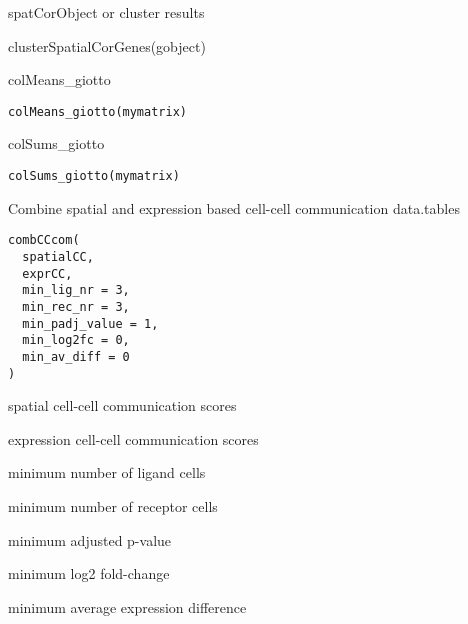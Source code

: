 \documentclass[a4paper]{book}
\begin{document}
%
\begin{Value}
spatCorObject or cluster results
\end{Value}
%
\begin{Examples}
\begin{ExampleCode}
    clusterSpatialCorGenes(gobject)
\end{ExampleCode}
\end{Examples}
%
\begin{Description}\relax
colMeans\_giotto
\end{Description}
%
\begin{Usage}
\begin{verbatim}
colMeans_giotto(mymatrix)
\end{verbatim}
\end{Usage}
%
\begin{Description}\relax
colSums\_giotto
\end{Description}
%
\begin{Usage}
\begin{verbatim}
colSums_giotto(mymatrix)
\end{verbatim}
\end{Usage}
%
\begin{Description}\relax
Combine spatial and expression based cell-cell communication data.tables
\end{Description}
%
\begin{Usage}
\begin{verbatim}
combCCcom(
  spatialCC,
  exprCC,
  min_lig_nr = 3,
  min_rec_nr = 3,
  min_padj_value = 1,
  min_log2fc = 0,
  min_av_diff = 0
)
\end{verbatim}
\end{Usage}
%
\begin{Arguments}
\begin{ldescription}
\item[\code{spatialCC}] spatial cell-cell communication scores

\item[\code{exprCC}] expression cell-cell communication scores

\item[\code{min\_lig\_nr}] minimum number of ligand cells

\item[\code{min\_rec\_nr}] minimum number of receptor cells

\item[\code{min\_padj\_value}] minimum adjusted p-value

\item[\code{min\_log2fc}] minimum log2 fold-change

\item[\code{min\_av\_diff}] minimum average expression difference
\end{ldescription}
\end{Arguments}
\end{document}

